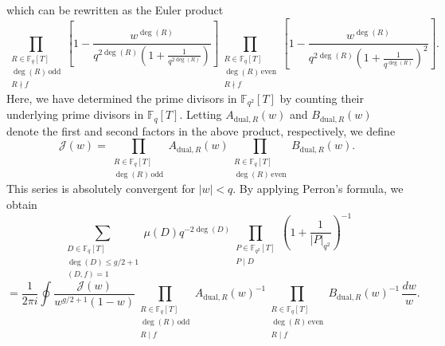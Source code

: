 \documentclass[table]{amsart}
\newcommand{\F}{\mathbb{F}}
\numberwithin{equation}{section}
\begin{document}
which can be rewritten as the Euler product  
\[
\prod_{\substack{R \in \mathbb{F}_q[T] \\ \deg(R)  \,\mathrm{ odd} \\ R \nmid f}} \left[ 1- \frac{w^{\deg(R)}}{q^{2 \deg(R)} (1+ \frac{1}{q^{2 \deg(R)}})}\right]\prod_{\substack{R \in \mathbb{F}_q[T] \\ \deg(R)  \,\mathrm{ even} \\ R \nmid f}} \left[ 1- \frac{w^{\deg(R)}}{q^{2 \deg(R)} ( 1+ \frac{1}{q^{\deg(R)}})^2}\right].
\]
Here, we have determined the prime divisors in \(\mathbb{F}_{q^2}[T]\) by counting their underlying prime divisors in \(\mathbb{F}_q[T]\). Letting \( A_{\mathrm{dual},R}(w) \) and \( B_{\mathrm{dual},R}(w) \) denote the first and second factors in the above product, respectively, we define  
\[
\mathcal{J}(w) = \prod_{\substack{R \in \mathbb{F}_q[T] \\ \deg(R)  \,\mathrm{ odd}}} 
A_{\mathrm{dual},R}(w) \prod_{\substack{R \in \mathbb{F}_q[T] 
\\ \deg(R)  \,\mathrm{ even}}} 
B_{\mathrm{dual},R}(w).
\]
This series is absolutely convergent for \( |w|<q \). By applying Perron's formula, we obtain  
\[
\sum_{\substack{D \in \F_q[T]\\ \deg(D) \leq g/2 + 1\\(D,f)=1}} \mu(D)     q^{-2\deg(D)}  \prod_{\substack{P \in \mathbb{F}_{q^2}[T] \\ P\mid D}} \left (1+ \frac{1}{|P|_{q^2}} \right )^{-1}  
\]
\[
= \frac{1}{2 \pi i} \oint \frac{\mathcal{J}(w)}{w^{g/2+1}(1-w)} 
\prod_{\substack{R \in \mathbb{F}_q[T] \\ \deg(R)  \,\mathrm{ odd} \\ R \mid f}} A_{\mathrm{dual},R}(w)^{-1} \prod_{\substack{R \in \mathbb{F}_q[T] \\ \deg(R)  \,\mathrm{ even} \\ R\mid f}} B_{\mathrm{dual},R}(w)^{-1} \, \frac{dw}{w}.
\]
\end{document}
